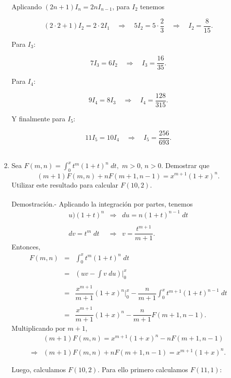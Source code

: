 \begin{enumerate}[\bfseries 1.]
	Aplicando $(2n+1)I_n = 2nI_{n-1}$, para $I_2$ tenemos

	$$(2\cdot 2+1)I_2 = 2\cdot 2I_1 \quad \Rightarrow \quad 5I_2=5\cdot \dfrac{2}{3}\quad \Rightarrow \quad I_2=\dfrac{8}{15}.$$

	Para $I_3$:

	$$7I_3=6I_2\quad \Rightarrow \quad I_3=\dfrac{16}{35}.$$

	Para $I_4$:

	$$9I_4=8I_3\quad \Rightarrow \quad I_4=\dfrac{128}{315}.$$

	Y finalmente para $I_5$:

	$$11I_5=10I_4\quad \Rightarrow \quad I_5=\dfrac{256}{693}.$$\\


    \item Sea $F(m,n)=\displaystyle\int_0^x t^m(1+t)^n \; dt,$ $m>0$, $n>0$. Demostrar que
    $$(m+1)F(m,n)+nF(m+1,n-1)=x^{m+1}(1+x)^n.$$
    Utilizar este resultado para calcular $F(10,2)$.\\\\
	Demostración.-\; Aplicando la integración por partes, tenemos
	$$
	\begin{array}{rcl}
	    u)(1+t)^n & \Rightarrow & du=n(1+t)^{n-1}\; dt\\\\
	    dv = t^m \; dt & \Rightarrow & v=\dfrac{t^{m+1}}{m+1}.
	\end{array}
	$$
	Entonces,
	$$
	\begin{array}{rcl}
	    F(m,n) &=& \displaystyle\int_0^x t^m(1+t)^n \; dt\\\\
		   &=& \left(uv-\displaystyle\int v\; du\right)\bigg|_0^x\\\\
		   &=& \dfrac{x^{m+1}}{m+1}(1+x)^n\bigg|_0^x - \dfrac{n}{m+1}\displaystyle\int_0^x t^{m+1}(1+t)^{n-1}\; dt\\\\
		   &=& \dfrac{x^{m+1}}{m+1}(1+x)^n - \dfrac{n}{m+1} F(m+1,n-1).
	\end{array}
	$$
	Multiplicando por $m+1$,
	$$
	\begin{array}{cl}
	&(m+1)F(m,n)=x^{m+1}(1+x)^n - n F(m+1,n-1)\\\\
	    \Rightarrow  & (m+1)F(m,n)+nF(m+1,n-1)=x^{m+1}(1+x)^n.
	\end{array}
	$$

	Luego, calculamos $F(10,2)$. Para ello primero calculamos $F(11,1)$:


\end{enumerate}
